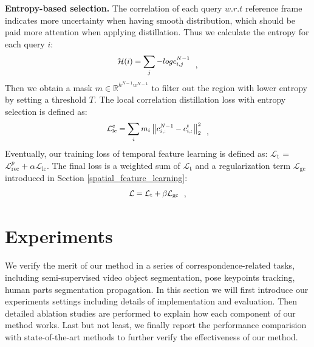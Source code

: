 \documentclass{article}
\begin{document}
\textbf{Entropy-based selection.} The correlation of each query $w.r.t$ reference frame indicates more uncertainty when having smooth distribution, which should be paid more attention when applying distillation. Thus we calculate the entropy for each query $i$:
\begin{equation}\label{eq:pyramid reconstruction loss}
  \small
  \begin{aligned}
    \mathcal{H}(i)=\sum_j-log c^{N-1}_{i,j}
  \end{aligned}~~,
\end{equation}
Then we obtain a mask $m \in \mathbb{R}^{h^{N-1}w^{N-1}}$ to filter out the region with lower entropy by setting a threshold $T$. The local correlation distillation loss with entropy selection is defined as:
\begin{equation}\label{eq:reconstruction loss}
  \small
  \begin{aligned}
    \mathcal{L}^e_{\mathrm{lc}}=\sum_im_i\left\|c_{i,:}^{N-1}-c_{i,:}^t\right\|^2_{2}
  \end{aligned}~~,
\end{equation}
Eventually, our training loss of temporal feature learning is defined as: $\mathcal{L}_\mathrm{t}$ =  $\mathcal{L}^p_{\mathrm{rec}} + \alpha  \mathcal{L}_{\mathrm{lc}}$. The final loss is a weighted sum of  $\mathcal{L}_\mathrm{t}$ and a regularization term $\mathcal{L}_\mathrm{gc}$ introduced in Section \ref{spatial_feature_learning}:
\begin{equation}\label{eq:final loss}
  \small
  \begin{aligned}
    \mathcal{L} = \mathcal{L}_{\mathrm{t}}  + \beta  \mathcal{L}_{\mathrm{gc}}
  \end{aligned}~~,
\end{equation}


\section{Experiments}
We verify the merit of our method in a series of correspondence-related tasks, including semi-supervised video object segmentation, pose keypoints tracking, human parts segmentation propagation. In this section we will first introduce our experiments settings including details of implementation  and evaluation. Then detailed ablation studies are performed to  explain how each component of our method works. Last but not least, we finally report the performance comparision with state-of-the-art methods to further verify the effectiveness of our method.
\end{document}
